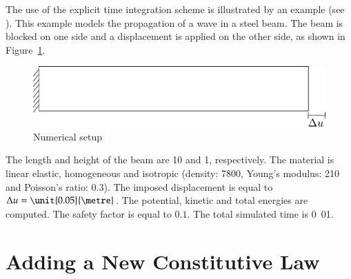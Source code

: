 The use of the explicit time integration scheme is illustrated by an
example (see ).  This
example models the propagation of a wave in a steel beam. The beam is
blocked on one side and a displacement is applied on the other side,
as shown in Figure~\ref{fig:smm:explicit}.

\begin{figure}[!htb] \centering
  \includegraphics[scale=.6]{figures/explicit_dynamic}
  \caption{Numerical setup \label{fig:smm:explicit}}
\end{figure}

The length and height of the beam are \unit{10}{\metre} and
\unit{1}{\metre}, respectively.  The material is linear elastic,
homogeneous and isotropic (density:
\unit{7800}{\kilogrampercubicmetre}, Young's modulus:
\unit{210}{\giga\pascal} and Poisson's ratio: $0.3$).  The imposed
displacement is equal to $\Delta u = \unit{0.05}{\metre}$. The
potential, kinetic and total energies are computed.  The safety factor
is equal to $0.1$.  The total simulated time is \unit{0.01}{\second}.



\section{Adding a New Constitutive Law}


